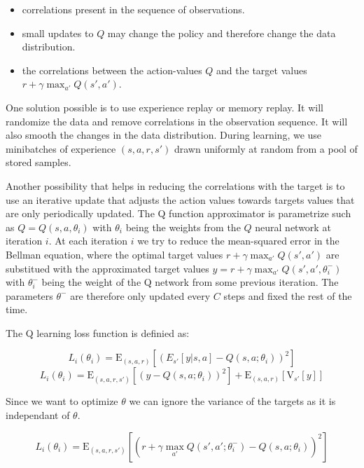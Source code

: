 \documentclass[12pt]{article}
\begin{document}
\begin{itemize}
\item correlations present in the sequence of observations.
\item small updates to $Q$ may change the policy and therefore change the data distribution.
\item the correlations between the action-values $Q$ and the target values $r + \gamma \max_{a'} Q(s',a')$.
\end{itemize}


One solution possible is to use experience replay or memory replay. 
It will randomize the data and remove correlations in the observation sequence. 
It will also smooth the changes in the data distribution. 
During learning, we use minibatches of experience $(s,a,r,s')$ drawn uniformly at random from a pool of stored samples.

Another possibility that helps in reducing the correlations with the target is to use an iterative update that adjusts the action values towards targets values that are only periodically updated.
The Q function approximator is parametrize such as $Q=Q(s,a,\theta_{i})$ with $\theta_i$ being the weights from the $Q$ neural network at iteration $i$.
At each iteration $i$ we try to reduce the mean-squared error in the Bellman equation, where the optimal target values $r+\gamma  \max_{a'} Q(s',a')$ are substitued with the approximated target values $y=r+\gamma  \max_{a'} Q(s',a',\theta_i^-)$ with $\theta_i^-$ being the weight of the Q network from some previous iteration.
The parameters $\theta^-$ are therefore only updated every $C$ steps and fixed the rest of the time.

The Q learning loss function is definied as:

\begin{equation} 
 	L_{i}(\theta_{i}) =\mathrm{E}_{(s,a,r)}[( E_{s'}[y|s,a]-Q(s,a;\theta_i))^2]
\end{equation}
\begin{equation} 
	L_{i}(\theta_{i}) =\mathrm{E}_{(s,a,r,s')}[(y-Q(s,a;\theta_i))^2]+\mathrm{E}_{(s,a,r)} [\mathrm{V}_{s'}[y]]
\end{equation} 

Since we want to optimize $\theta$ we can ignore the variance of the targets as it is independant of $\theta$.

\begin{equation}  
L_{i}(\theta_{i}) =\mathrm{E}_{(s,a,r,s')}[(r+\gamma  \max_{a'} Q(s',a'; \theta_{i}^- )-Q(s,a;\theta_{i}))^2]
\end{equation} 
\end{document}
